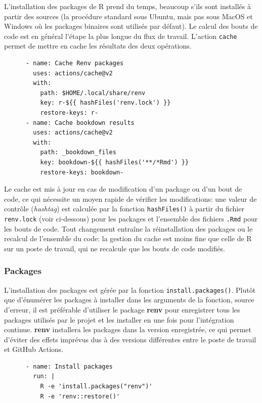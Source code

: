 \documentclass[
  12pt,
  french,
  a4paper,
  extrafontsizes,onecolumn,openright
  ]{memoir}
\begin{document}
L'installation des packages de R prend du temps, beaucoup s'ils sont installés à partir des sources (la procédure standard sous Ubuntu, mais pas sous MacOS et Windows où les packages binaires sont utilisés par défaut).
Le calcul des bouts de code est en général l'étape la plus longue du flux de travail.
L'action \texttt{cache} permet de mettre en cache les résultats des deux opérations.

\begin{verbatim}
      - name: Cache Renv packages
        uses: actions/cache@v2
        with:
          path: $HOME/.local/share/renv
          key: r-${{ hashFiles('renv.lock') }}
          restore-keys: r-
      - name: Cache bookdown results
        uses: actions/cache@v2
        with:
          path: _bookdown_files
          key: bookdown-${{ hashFiles('**/*Rmd') }}
          restore-keys: bookdown-
\end{verbatim}

Le cache est mis à jour en cas de modification d'un package ou d'un bout de code, ce qui nécessite un moyen rapide de vérifier les modifications: une valeur de contrôle (\emph{hashtag}) est calculée par la fonction \texttt{hashFiles()} à partir du fichier \texttt{renv.lock} (voir ci-dessous) pour les packages et l'ensemble des fichiers \texttt{.Rmd} pour les bouts de code.
Tout changement entraîne la réinstallation des packages ou le recalcul de l'ensemble du code: la gestion du cache est moins fine que celle de R sur un poste de travail, qui ne recalcule que les bouts de code modifiés.

\hypertarget{sec:packages-ci}{%
\subsubsection{Packages}\label{sec:packages-ci}}

L'installation des packages est gérée par la fonction \texttt{install.packages()}.
Plutôt que d'énumérer les packages à installer dans les arguments de la fonction, source d'erreur, il est préférable d'utiliser le package \textbf{renv} pour enregistrer tous les packages utilisés par le projet et les installer en une fois pour l'intégration continue.
\textbf{renv} installera les packages dans la version enregistrée, ce qui permet d'éviter des effets imprévus dus à des versions différentes entre le poste de travail et GitHub Actions.

\begin{verbatim}
      - name: Install packages
        run: |
          R -e 'install.packages("renv")'
          R -e 'renv::restore()'
\end{verbatim}
\end{document}
